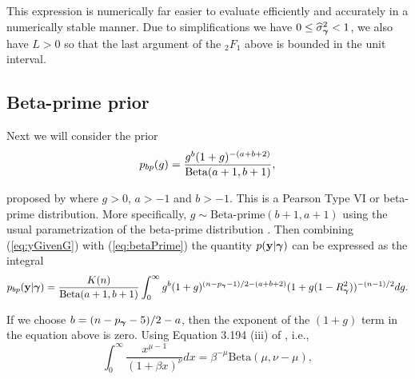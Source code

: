 

\noindent 
This expression is numerically far easier to evaluate efficiently and accurately in a numerically stable manner. Due to simplifications
we have $0\le \widehat{\sigma}_{\boldsymbol \gamma}^2<1$, we also have $L>0$ so that the last argument
of the ${}_2F_1$ above is bounded in the unit interval.  







\subsection{Beta-prime prior} 

\noindent
Next we will consider the prior 
\begin{equation}\label{eq:betaPrime}
	\displaystyle p_{bp}(g) = \frac{g^{b}(1 + g)^{-(a+b+2)}}{\mbox{Beta}(a+1,b+1)},
\end{equation}

\noindent proposed by \cite{Maruyama2011} where $g>0$, $a>-1$ and $b>-1$. 
This is a Pearson Type VI or beta-prime distribution. More specifically, 
$g\sim \mbox{Beta-prime}(b+1,a+1)$ using the usual parametrization of 
the beta-prime distribution \citep{Johnson1995}.
Then combining (\ref{eq:yGivenG}) with (\ref{eq:betaPrime}) the quantity $p({\bf y}|{\boldsymbol \gamma})$ 
can be expressed as the integral
$$
\displaystyle p_{bp}({\bf y}|{\boldsymbol \gamma}) 
=
\frac{K(n)}{\mbox{Beta}(a+1,b+1)}
\int_0^\infty             
g^{b}(1 + g)^{(n - p_{\boldsymbol \gamma} - 1)/2 - (a + b + 2)}  (1 + g (1-R_{\boldsymbol \gamma}^2) )^{-(n-1)/2}  
dg.
$$

\noindent If we choose 
$b = (n - p_{\boldsymbol \gamma} - 5)/2 - a$, then the exponent of the $(1 + g)$ term in the equation above is zero.
Using Equation 3.194 (iii) of \cite{Gradshteyn2007}, i.e.,
$$
\int_0^\infty \frac{ x^{\mu - 1} }{(1 + \beta x)^\nu} dx = \beta^{-\mu} \mbox{Beta}(\mu,\nu - \mu),
$$

